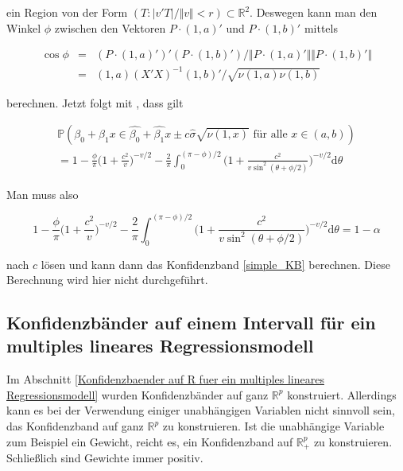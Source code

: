 \documentclass[12pt,a4paper]{article}
\theoremstyle{definition}
\theoremstyle{definition}
\theoremstyle{definition}
\theoremstyle{definition}
\begin{document}
ein Region von der Form $(T : \vert v'T \vert / \Vert v \Vert < r) \subset \mathbb{R}^2$. Deswegen kann man den Winkel $\phi$ zwischen den Vektoren $P \cdot (1,a)'$ und $P \cdot (1,b)'$ mittels

\begin{eqnarray*}
\cos \phi &=& (P \cdot (1,a)')' (P \cdot (1,b)') / \Vert P \cdot (1,a)' \Vert \Vert P \cdot (1,b)' \Vert \\
&=& (1,a) (X'X)^{-1} (1,b)' / \sqrt{\nu(1,a) \nu(1,b)} 
\end{eqnarray*}

berechnen. Jetzt folgt mit \cite{Wynn71}, dass gilt
%
%
%


\begin{eqnarray*}
\mathbb{P}(\beta_0 + \beta_1 x \in \hat{\beta_0} + \hat{\beta_1} x \pm c \hat{\sigma} \sqrt{\nu(1,x)} \text{ für alle } x \in (a,b) ) \\
= 1 - \frac{\phi}{\pi} \biggl( 1 + \frac{c^2}{v} \biggr)^{ - v/2} - \frac{2}{\pi} \int^{(\pi - \phi)/2}_{0} \biggl( 1 + \frac{c^2}{v \sin^2(\theta + \phi/2)} \biggr)^{-v/2} \text{d} \theta
\end{eqnarray*}

Man muss also 

\begin{equation*}
1 - \frac{\phi}{\pi} \biggl( 1 + \frac{c^2}{v} \biggr)^{ - v/2} - \frac{2}{\pi} \int^{(\pi - \phi)/2}_{0} \biggl( 1 + \frac{c^2}{v \sin^2(\theta + \phi/2)} \biggr)^{-v/2} \text{d} \theta = 1 - \alpha
\end{equation*}

nach $c$ lösen und kann dann das Konfidenzband \eqref{simple_KB} berechnen. Diese Berechnung wird hier nicht durchgeführt.





\subsection{Konfidenzbänder auf einem Intervall für ein multiples lineares Regressionsmodell}
\label{Konfidenzbaender auf einem Intervall fuer ein multiples lineares Regressionsmodell}
Im Abschnitt \ref{Konfidenzbaender auf R fuer ein multiples lineares Regressionsmodell} wurden Konfidenzbänder auf ganz $\mathbb{R}^p$ konstruiert. Allerdings kann es bei der Verwendung einiger unabhängigen Variablen nicht sinnvoll sein, das Konfidenzband auf ganz $\mathbb{R}^{p}$ zu konstruieren. Ist die unabhängige Variable zum Beispiel ein Gewicht, reicht es, ein Konfidenzband auf $\mathbb{R}_{+}^{p}$ zu konstruieren. Schließlich sind Gewichte immer positiv.
\end{document}

